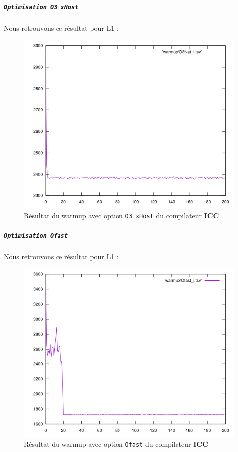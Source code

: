 \documentclass{report}
\begin{document}
\newpage
\subparagraph{ \texttt{Optimisation O3 xHost}}
Nous retrouvons ce résultat pour L1 :
  \begin{figure}[ht!]
    \centering
    \includegraphics[scale=0.45]{resources/L1/warmup/O3Nat_i.png}
    \caption{Résultat du warmup avec option \texttt{O3 xHost} du compilateur \textbf{ICC}}
  \end{figure}
  \newpage
\subparagraph{ \texttt{Optimisation Ofast}}
Nous retrouvons ce résultat pour L1 :
  \begin{figure}[ht!]
    \centering
    \includegraphics[scale=0.45]{resources/L1/warmup/Ofast_i.png}
    \caption{Résultat du warmup avec option \texttt{Ofast} du compilateur \textbf{ICC}}
  \end{figure}
\end{document}
